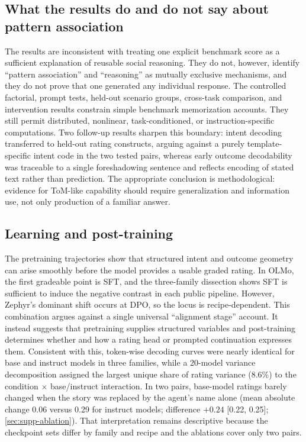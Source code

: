 \subsection{What the results do and do not say about pattern association}

The results are inconsistent with treating one explicit benchmark score as a sufficient explanation of reusable social reasoning.
They do not, however, identify ``pattern association'' and ``reasoning'' as mutually exclusive mechanisms, and they do not prove that one generated any individual response.
The controlled factorial, prompt tests, held-out scenario groups, cross-task comparison, and intervention results constrain simple benchmark memorization accounts.
They still permit distributed, nonlinear, task-conditioned, or instruction-specific computations.
Two follow-up results sharpen this boundary: intent decoding transferred to held-out rating constructs, arguing against a purely template-specific intent code in the two tested pairs, whereas early outcome decodability was traceable to a single foreshadowing sentence and reflects encoding of stated text rather than prediction.
The appropriate conclusion is methodological: evidence for ToM-like capability should require generalization and information use, not only production of a familiar answer.

\subsection{Learning and post-training}

The pretraining trajectories show that structured intent and outcome geometry can arise smoothly before the model provides a usable graded rating.
In OLMo, the first gradeable point is SFT, and the three-family dissection shows SFT is sufficient to induce the negative contrast in each public pipeline.
However, Zephyr's dominant shift occurs at DPO, so the locus is recipe-dependent.
This combination argues against a single universal ``alignment stage'' account.
It instead suggests that pretraining supplies structured variables and post-training determines whether and how a rating head or prompted continuation expresses them.
Consistent with this, token-wise decoding curves were nearly identical for base and instruct models in three families, while a 20-model variance decomposition assigned the largest unique share of rating variance (8.6\%) to the condition $\times$ base/instruct interaction.
In two pairs, base-model ratings barely changed when the story was replaced by the agent's name alone (mean absolute change 0.06 versus 0.29 for instruct models; difference $+0.24$ [0.22, 0.25]; \cref{sec:supp-ablation}).
That interpretation remains descriptive because the checkpoint sets differ by family and recipe and the ablations cover only two pairs.

